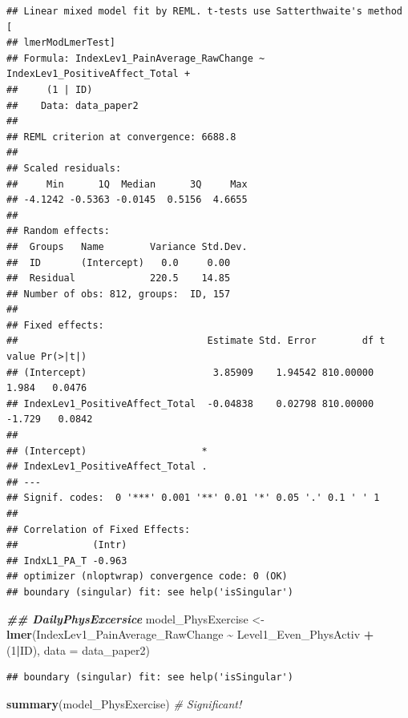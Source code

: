 \documentclass[
  12pt,
]{article}
\newenvironment{Shaded}{\begin{snugshade}}{\end{snugshade}}
\newcommand{\AttributeTok}[1]{\textcolor[rgb]{0.13,0.29,0.53}{#1}}
\newcommand{\CommentTok}[1]{\textcolor[rgb]{0.56,0.35,0.01}{\textit{#1}}}
\newcommand{\DecValTok}[1]{\textcolor[rgb]{0.00,0.00,0.81}{#1}}
\newcommand{\DocumentationTok}[1]{\textcolor[rgb]{0.56,0.35,0.01}{\textbf{\textit{#1}}}}
\newcommand{\FunctionTok}[1]{\textcolor[rgb]{0.13,0.29,0.53}{\textbf{#1}}}
\newcommand{\NormalTok}[1]{#1}
\newcommand{\OtherTok}[1]{\textcolor[rgb]{0.56,0.35,0.01}{#1}}
\newcommand{\SpecialCharTok}[1]{\textcolor[rgb]{0.81,0.36,0.00}{\textbf{#1}}}
\begin{document}
\begin{verbatim}
## Linear mixed model fit by REML. t-tests use Satterthwaite's method [
## lmerModLmerTest]
## Formula: IndexLev1_PainAverage_RawChange ~ IndexLev1_PositiveAffect_Total +  
##     (1 | ID)
##    Data: data_paper2
## 
## REML criterion at convergence: 6688.8
## 
## Scaled residuals: 
##     Min      1Q  Median      3Q     Max 
## -4.1242 -0.5363 -0.0145  0.5156  4.6655 
## 
## Random effects:
##  Groups   Name        Variance Std.Dev.
##  ID       (Intercept)   0.0     0.00   
##  Residual             220.5    14.85   
## Number of obs: 812, groups:  ID, 157
## 
## Fixed effects:
##                                 Estimate Std. Error        df t value Pr(>|t|)
## (Intercept)                      3.85909    1.94542 810.00000   1.984   0.0476
## IndexLev1_PositiveAffect_Total  -0.04838    0.02798 810.00000  -1.729   0.0842
##                                 
## (Intercept)                    *
## IndexLev1_PositiveAffect_Total .
## ---
## Signif. codes:  0 '***' 0.001 '**' 0.01 '*' 0.05 '.' 0.1 ' ' 1
## 
## Correlation of Fixed Effects:
##             (Intr)
## IndxL1_PA_T -0.963
## optimizer (nloptwrap) convergence code: 0 (OK)
## boundary (singular) fit: see help('isSingular')
\end{verbatim}

\begin{Shaded}
\begin{Highlighting}[]
\DocumentationTok{\#\# DailyPhysExcersice}
\NormalTok{model\_PhysExercise }\OtherTok{\textless{}{-}} \FunctionTok{lmer}\NormalTok{(IndexLev1\_PainAverage\_RawChange }\SpecialCharTok{\textasciitilde{}}\NormalTok{ Level1\_Even\_PhysActiv }\SpecialCharTok{+}\NormalTok{ (}\DecValTok{1}\SpecialCharTok{|}\NormalTok{ID), }\AttributeTok{data =}\NormalTok{ data\_paper2)}
\end{Highlighting}
\end{Shaded}

\begin{verbatim}
## boundary (singular) fit: see help('isSingular')
\end{verbatim}

\begin{Shaded}
\begin{Highlighting}[]
\FunctionTok{summary}\NormalTok{(model\_PhysExercise) }\CommentTok{\# Significant! }
\end{Highlighting}
\end{Shaded}
\end{document}

